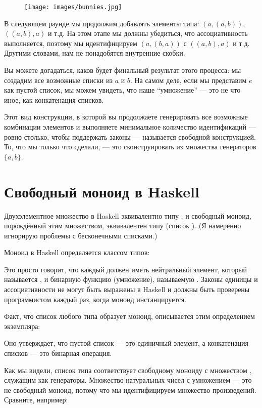 \begin{figure}[H]
  \centering
  \texttt{[image: images/bunnies.jpg]}
\end{figure}

\noindent
В следующем раунде мы продолжим добавлять элементы типа:
$(a, (a, b))$, $((a, b), a)$ и т.д. На этом этапе мы
должны убедиться, что ассоциативность выполняется, поэтому мы идентифицируем
$(a, (b, a))$ с $((a, b), a)$ и т.д. Другими словами,
нам не понадобятся внутренние скобки.

Вы можете догадаться, каков будет финальный результат этого процесса: мы
создадим все возможные списки из $a$ и $b$. На самом деле, если мы
представим $e$ как пустой список, мы можем увидеть, что наше
``умножение'' --- это не что иное, как конкатенация списков.

Этот вид конструкции, в которой вы продолжаете генерировать все возможные
комбинации элементов и выполняете минимальное количество
идентификаций --- ровно столько, чтобы поддержать законы --- называется свободной
конструкцией. То, что мы только что сделали, --- это сконструировать  из множества генераторов $\{a, b\}$.

\section{Свободный моноид в Haskell}

Двухэлементное множество в Haskell эквивалентно типу ,
и свободный моноид, порождённый этим множеством, эквивалентен типу
\code{{[}Bool{]}} (список ). (Я намеренно игнорирую
проблемы с бесконечными списками.)

Моноид в Haskell определяется классом типов:

Это просто говорит, что каждый  должен иметь нейтральный элемент,
который называется , и бинарную функцию (умножение),
называемую . Законы единицы и ассоциативности не могут быть
выражены в Haskell и должны быть проверены программистом каждый раз, когда
моноид инстанцируется.

Факт, что список любого типа образует моноид, описывается этим
определением экземпляра:

Оно утверждает, что пустой список \code{{[}{]}} --- это единичный элемент, а
конкатенация списков \code{(++)} --- это бинарная операция.

Как мы видели, список типа  соответствует свободному моноиду
с множеством , служащим как генераторы. Множество натуральных
чисел с умножением --- это не свободный моноид, потому что мы идентифицируем
множество произведений. Сравните, например:

